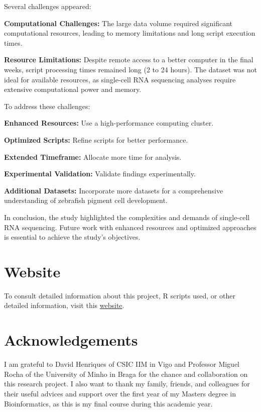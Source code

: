 \documentclass[runningheads]{llncs}
\begin{document}
Several challenges appeared:

\textbf{Computational Challenges:} The large data volume required significant computational resources, leading to memory limitations and long script execution times.

\textbf{Resource Limitations:} Despite remote access to a better computer in the final weeks, script processing times remained long (2 to 24 hours). The dataset was not ideal for available resources, as single-cell RNA sequencing analyses require extensive computational power and memory.

To address these challenges:

\textbf{Enhanced Resources:} Use a high-performance computing cluster.

\textbf{Optimized Scripts:} Refine scripts for better performance.

\textbf{Extended Timeframe:} Allocate more time for analysis.

\textbf{Experimental Validation:} Validate findings experimentally.

\textbf{Additional Datasets:} Incorporate more datasets for a comprehensive understanding of zebrafish pigment cell development.

In conclusion, the study highlighted the complexities and demands of single-cell RNA sequencing. Future work with enhanced resources and optimized approaches is essential to achieve the study's objectives.

\section*{Website}

To consult detailed information about this project, R scripts used, or other detailed information, visit this \href{https://github.com/dasesteves/projeto}{website}.

\section*{Acknowledgements}
I am grateful to David Henriques of CSIC IIM in Vigo and Professor Miguel Rocha of the University of Minho in Braga for the chance and collaboration on this research project. I also want to thank my family, friends, and colleagues for their useful advices and support over the first year of my Masters degree in Bioinformatics, as this is my final course during this academic year.

\newpage


\end{document}
